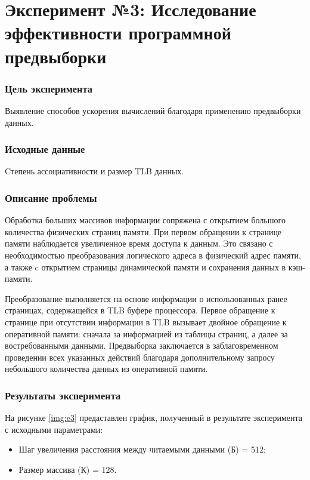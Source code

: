 \chapter*{Эксперимент №3: Исследование эффективности программной предвыборки}

\subsection*{Цель эксперимента}
Выявление способов ускорения вычислений благодаря применению предвыборки данных. 

\subsection*{Исходные данные}
Cтепень ассоциативности и размер TLB данных.

\subsection*{Описание проблемы}
Обработка больших массивов информации сопряжена с открытием большого количества физических страниц памяти. При первом обращении к странице памяти наблюдается увеличенное время доступа к данным. Это связано с необходимостью преобразования логического адреса в физический адрес памяти, а также c открытием страницы динамической памяти и сохранения данных в кэш-памяти.

Преобразование выполняется на основе информации о использованных ранее страницах, содержащейся в TLB буфере процессора. Первое обращение к странице при отсутствии информации в TLB вызывает двойное обращение к оперативной памяти: сначала за информацией из таблицы страниц, а далее за востребованными данными. Предвыборка заключается в заблаговременном проведении всех указанных действий благодаря дополнительному запросу небольшого количества данных из оперативной памяти. 

\subsection*{Результаты эксперимента}
На рисунке \ref{img:e3} предаставлен график, полученный в результате эксперимента с исходными параметрами:
\begin{itemize}
	\item Шаг увеличения расстояния между читаемыми данными
(Б) = 512;
	\item Размер массива (К) = 128.
\end{itemize}

